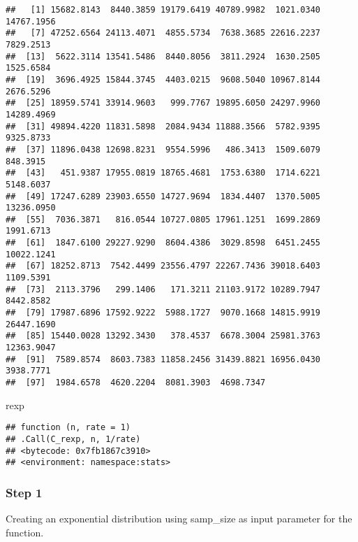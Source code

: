 \documentclass[]{article}
\newenvironment{Shaded}{\begin{snugshade}}{\end{snugshade}}
\newcommand{\NormalTok}[1]{#1}
\begin{document}
\begin{verbatim}
##   [1] 15682.8143  8440.3859 19179.6419 40789.9982  1021.0340 14767.1956
##   [7] 47252.6564 24113.4071  4855.5734  7638.3685 22616.2237  7829.2513
##  [13]  5622.3114 13541.5486  8440.8056  3811.2924  1630.2505  1525.6584
##  [19]  3696.4925 15844.3745  4403.0215  9608.5040 10967.8144  2676.5296
##  [25] 18959.5741 33914.9603   999.7767 19895.6050 24297.9960 14289.4969
##  [31] 49894.4220 11831.5898  2084.9434 11888.3566  5782.9395  9325.8733
##  [37] 11896.0438 12698.8231  9554.5996   486.3413  1509.6079   848.3915
##  [43]   451.9387 17955.0819 18765.4681  1753.6380  1714.6221  5148.6037
##  [49] 17247.6289 23903.6550 14727.9694  1834.4407  1370.5005 13236.0950
##  [55]  7036.3871   816.0544 10727.0805 17961.1251  1699.2869  1991.6713
##  [61]  1847.6100 29227.9290  8604.4386  3029.8598  6451.2455 10022.1241
##  [67] 18252.8713  7542.4499 23556.4797 22267.7436 39018.6403  1109.5391
##  [73]  2113.3796   299.1406   171.3211 21103.9172 10289.7947  8442.8582
##  [79] 17987.6896 17592.9222  5988.1727  9070.1668 14815.9919 26447.1690
##  [85] 15440.0028 13292.3430   378.4537  6678.3004 25981.3763 12363.9047
##  [91]  7589.8574  8603.7383 11858.2456 31439.8821 16956.0430  3938.7771
##  [97]  1984.6578  4620.2204  8081.3903  4698.7347
\end{verbatim}

\begin{Shaded}
\begin{Highlighting}[]
\NormalTok{rexp}
\end{Highlighting}
\end{Shaded}

\begin{verbatim}
## function (n, rate = 1) 
## .Call(C_rexp, n, 1/rate)
## <bytecode: 0x7fb1867c3910>
## <environment: namespace:stats>
\end{verbatim}

\subsubsection{Step 1}\label{step-1}

Creating an exponential distribution using samp\_size as input parameter
for the function.
\end{document}
